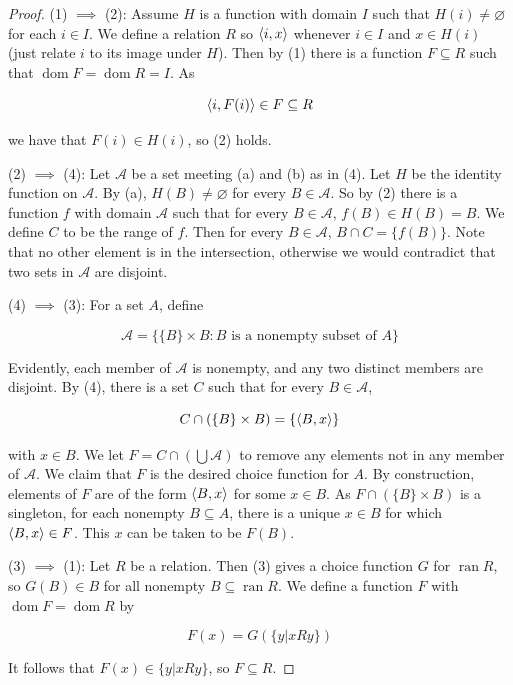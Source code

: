\begin{proof}
    (1) $\implies$ (2): Assume $H$ is a function with domain $I$ such that $H(i) \neq \varnothing$ for each $i \in I$. We define a relation $R$ so $\left\langle i,x \right\rangle$ whenever $i \in I$ and $x \in H(i)$ (just relate $i$ to its image under $H$). Then by (1) there is a function $F \subseteq R$ such that $\operatorname{dom}F = \operatorname{dom}R = I$. As 

    \[\left\langle i,F(i) \right\rangle \in F \subseteq R\]

    we have that $F(i) \in H(i)$, so (2) holds. 

    (2) $\implies$ (4): Let $\mathcal{A}$ be a set meeting (a) and (b) as in (4). Let $H$ be the identity function on $\mathcal{A}$. By (a), $H(B) \neq \varnothing$ for every $B \in \mathcal{A}$. So by (2) there is a function $f$ with domain $\mathcal{A}$ such that for every $B \in \mathcal{A}$, $f(B) \in H(B) = B$. We define $C$ to be the range of $f$. Then for every $B \in \mathcal{A}$, $B \cap C = \{f(B)\}$. Note that no other element is in the intersection, otherwise we would contradict that two sets in $\mathcal{A}$ are disjoint. 

    (4) $\implies$ (3): For a set $A$, define 

    \[\mathcal{A} = \{\{B\} \times B : B \text{ is a nonempty subset of $A$}\}\]

    Evidently, each member of $\mathcal{A}$ is nonempty, and any two distinct members are disjoint. By (4), there is a set $C$ such that for every $B \in \mathcal{A}$,

    \[C \cap (\{B\} \times B) = \{\left\langle B,x \right\rangle\}\]

    with $x \in B$. We let $F = C \cap (\bigcup \mathcal{A})$ to remove any elements not in any member of $\mathcal{A}$. We claim that $F$ is the desired choice function for $A$. By construction, elements of $F$ are of the form $\left\langle B,x \right\rangle$ for some $x \in B$. As $F \cap (\{B\} \times B)$ is a singleton, for each nonempty $B \subseteq A$, there is a unique $x \in B$ for which $\left\langle B,x \right\rangle \in F$. This $x$ can be taken to be $F(B)$. 

    (3) $\implies$ (1): Let $R$ be a relation. Then (3) gives a choice function $G$ for $\operatorname{ran}R$, so $G(B) \in B$ for all nonempty $B \subseteq \operatorname{ran}R$. We define a function $F$ with $\operatorname{dom}F = \operatorname{dom}R$ by

    \[F(x) = G(\{y | xRy\})\]

    It follows that $F(x) \in \{y | xRy\}$, so $F \subseteq R$. 


\end{proof}
